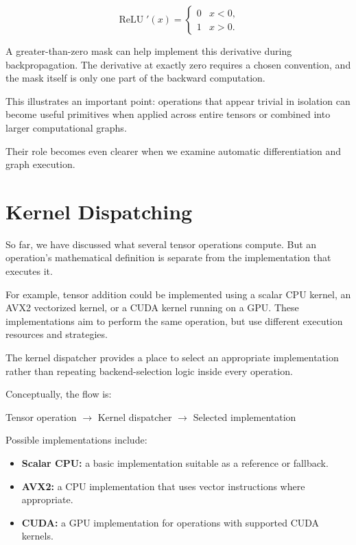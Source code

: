 \[
\operatorname{ReLU}'(x) =
\begin{cases}
0 & x < 0,\\
1 & x > 0.
\end{cases}
\]

A greater-than-zero mask can help implement this derivative during backpropagation. The derivative at exactly zero requires a chosen convention, and the mask itself is only one part of the backward computation.

This illustrates an important point: operations that appear trivial in isolation can become useful primitives when applied across entire tensors or combined into larger computational graphs.

Their role becomes even clearer when we examine automatic differentiation and graph execution.

\section{Kernel Dispatching}

So far, we have discussed what several tensor operations compute. But an operation's mathematical definition is separate from the implementation that executes it.

For example, tensor addition could be implemented using a scalar CPU kernel, an AVX2 vectorized kernel, or a CUDA kernel running on a GPU. These implementations aim to perform the same operation, but use different execution resources and strategies.

The kernel dispatcher provides a place to select an appropriate implementation rather than repeating backend-selection logic inside every operation.

Conceptually, the flow is:

\begin{center}
    Tensor operation
    \(\longrightarrow\)
    Kernel dispatcher
    \(\longrightarrow\)
    Selected implementation
\end{center}

Possible implementations include:

\begin{itemize}
    \item \textbf{Scalar CPU:} a basic implementation suitable as a reference or fallback.
    \item \textbf{AVX2:} a CPU implementation that uses vector instructions where appropriate.
    \item \textbf{CUDA:} a GPU implementation for operations with supported CUDA kernels.
\end{itemize}

